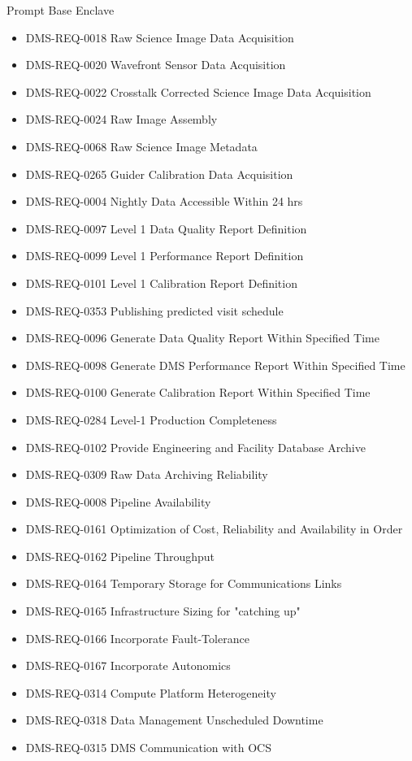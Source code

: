 Prompt Base Enclave \begin{itemize}
\item DMS-REQ-0018 Raw Science Image Data Acquisition
\item DMS-REQ-0020 Wavefront Sensor Data Acquisition
\item DMS-REQ-0022 Crosstalk Corrected Science Image Data Acquisition
\item DMS-REQ-0024 Raw Image Assembly
\item DMS-REQ-0068 Raw Science Image Metadata
\item DMS-REQ-0265 Guider Calibration Data Acquisition
\item DMS-REQ-0004 Nightly Data Accessible Within 24 hrs
\item DMS-REQ-0097 Level 1 Data Quality Report Definition
\item DMS-REQ-0099 Level 1 Performance Report Definition
\item DMS-REQ-0101 Level 1 Calibration Report Definition
\item DMS-REQ-0353 Publishing predicted visit schedule
\item DMS-REQ-0096 Generate Data Quality Report Within Specified Time
\item DMS-REQ-0098 Generate DMS Performance Report Within Specified Time
\item DMS-REQ-0100 Generate Calibration Report Within Specified Time
\item DMS-REQ-0284 Level-1 Production Completeness
\item DMS-REQ-0102 Provide Engineering and Facility Database Archive
\item DMS-REQ-0309 Raw Data Archiving Reliability
\item DMS-REQ-0008 Pipeline Availability
\item DMS-REQ-0161 Optimization of Cost, Reliability and Availability in Order
\item DMS-REQ-0162 Pipeline Throughput
\item DMS-REQ-0164 Temporary Storage for Communications Links
\item DMS-REQ-0165 Infrastructure Sizing for "catching up"
\item DMS-REQ-0166 Incorporate Fault-Tolerance
\item DMS-REQ-0167 Incorporate Autonomics
\item DMS-REQ-0314 Compute Platform Heterogeneity
\item DMS-REQ-0318 Data Management Unscheduled Downtime
\item DMS-REQ-0315 DMS Communication with OCS

\end{itemize}

